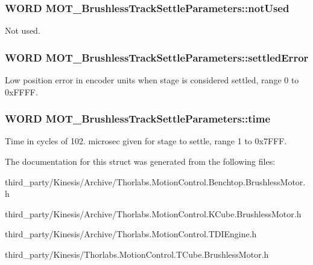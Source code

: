 \subsubsection[{\texorpdfstring{not\+Used}{notUsed}}]{\setlength{\rightskip}{0pt plus 5cm}W\+O\+RD M\+O\+T\+\_\+\+Brushless\+Track\+Settle\+Parameters\+::not\+Used}\hypertarget{struct_m_o_t___brushless_track_settle_parameters_ac50d2f73f7612952ab5fd5b2083fa4c8}{}\label{struct_m_o_t___brushless_track_settle_parameters_ac50d2f73f7612952ab5fd5b2083fa4c8}


Not used. 

\subsubsection[{\texorpdfstring{settled\+Error}{settledError}}]{\setlength{\rightskip}{0pt plus 5cm}W\+O\+RD M\+O\+T\+\_\+\+Brushless\+Track\+Settle\+Parameters\+::settled\+Error}\hypertarget{struct_m_o_t___brushless_track_settle_parameters_a7f96ba863a57f1519f49a4000c7b4265}{}\label{struct_m_o_t___brushless_track_settle_parameters_a7f96ba863a57f1519f49a4000c7b4265}


Low position error in encoder units when stage is considered settled, range 0 to 0x\+F\+F\+FF. 

\subsubsection[{\texorpdfstring{time}{time}}]{\setlength{\rightskip}{0pt plus 5cm}W\+O\+RD M\+O\+T\+\_\+\+Brushless\+Track\+Settle\+Parameters\+::time}\hypertarget{struct_m_o_t___brushless_track_settle_parameters_a5c83be0f26139a6f708a29424cdab022}{}\label{struct_m_o_t___brushless_track_settle_parameters_a5c83be0f26139a6f708a29424cdab022}


Time in cycles of 102. microsec given for stage to settle, range 1 to 0x7\+F\+FF. 



The documentation for this struct was generated from the following files\+:\begin{DoxyCompactItemize}
\item 
third\+\_\+party/\+Kinesis/\+Archive/Thorlabs.\+Motion\+Control.\+Benchtop.\+Brushless\+Motor.\+h\item 
third\+\_\+party/\+Kinesis/\+Archive/Thorlabs.\+Motion\+Control.\+K\+Cube.\+Brushless\+Motor.\+h\item 
third\+\_\+party/\+Kinesis/\+Archive/Thorlabs.\+Motion\+Control.\+T\+D\+I\+Engine.\+h\item 
third\+\_\+party/\+Kinesis/Thorlabs.\+Motion\+Control.\+T\+Cube.\+Brushless\+Motor.\+h\end{DoxyCompactItemize}
